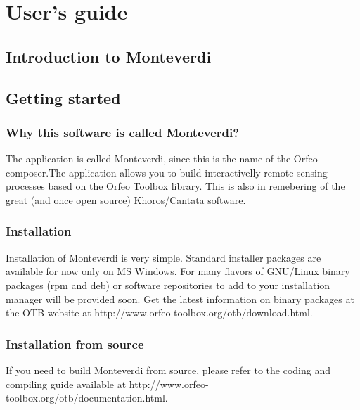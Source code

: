 \documentclass{InsightSoftwareGuide}
\begin{document}
%
%


%
\pagestyle{normal}
%
\small
\tableofcontents
\listoffigures
\listoftables
\normalsize




%
%

\mainmatter

\part{User's guide}\label{part:userguide}

\chapter{Introduction to Monteverdi}
\chapter{Getting started}
\section{Why this software is called Monteverdi?}
The application is called Monteverdi, since this is the name of the Orfeo composer.The application allows you to build 
interactivelly remote sensing processes based on the Orfeo Toolbox library. This is also in remebering of the great 
(and once open source) Khoros/Cantata software.
\section{Installation}
Installation of Monteverdi is very simple. Standard installer packages are available for now only on MS Windows. 
For many flavors of GNU/Linux binary packages (rpm and deb) or software repositories
to add to your installation manager will be provided soon. Get the latest information on binary packages at
the OTB website at http://www.orfeo-toolbox.org/otb/download.html.

\section{Installation from source}
If you need to build Monteverdi from source, please refer to the coding and compiling guide available at
http://www.orfeo-toolbox.org/otb/documentation.html.
 
\end{document}

